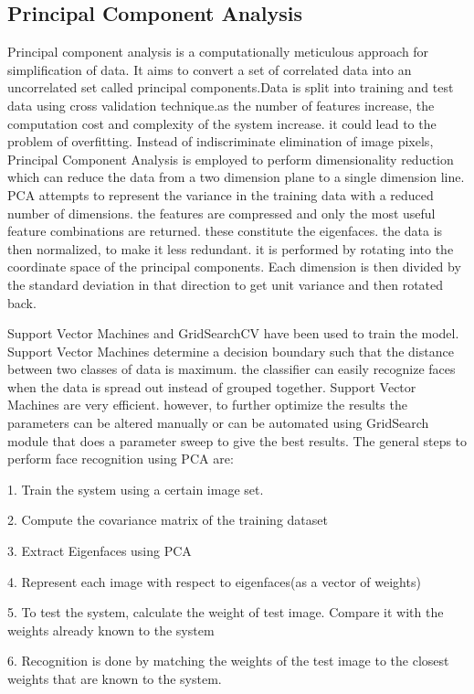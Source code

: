 \documentclass[conference]{IEEEtran}
\begin{document}
\subsection{Principal Component Analysis}
\label{subsec:3.1 Principal Component Analysis}
Principal component analysis is a computationally meticulous approach for simplification of data. It aims to convert a set of correlated data into an uncorrelated set called principal components\cite{turk1991face}.Data is split into training and test data using cross validation technique.as the number of features increase, the computation cost and complexity of the system increase. it could lead to the problem of overfitting. Instead of indiscriminate elimination of image pixels,  Principal Component Analysis is employed to perform dimensionality reduction which can reduce the data from a two dimension plane to a single dimension line. PCA attempts to represent the variance in the training data with a reduced number of dimensions.  the features are compressed and only the most useful feature combinations are returned. these constitute the eigenfaces. the data is then normalized, to make it less redundant. it is performed by rotating into the coordinate space of the principal components. Each dimension is then divided by the standard deviation in that direction to get unit variance and then rotated back. 

Support Vector Machines and GridSearchCV have been used to train the model. Support Vector Machines determine a decision boundary such that the distance between two classes of data is maximum. the classifier can easily recognize faces when the data is spread out instead of grouped together. Support Vector Machines are very efficient. however, to further optimize the results the parameters can be altered manually or can be automated using GridSearch module that does a parameter sweep to give the best results.
The general steps to perform face recognition using PCA are:

	1. Train the system using a certain image set.
    
    
	2. Compute the covariance matrix of the training dataset
    
	3. Extract Eigenfaces using PCA
	
    4. Represent each image with respect to eigenfaces(as a vector of weights)

5. To test the system, calculate the weight of test image. Compare it with the weights already known to the system

6. Recognition is done by matching the weights of the test image to the closest weights that are known to the system. 
\end{document}
